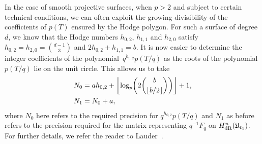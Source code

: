 \begin{rem} \label{rem:N0Surfaces}
In the case of smooth projective surfaces, when $p > 2$ and subject to 
certain technical conditions, we can often exploit the growing divisibility 
of the coefficients of $p(T)$ ensured by the Hodge polygon.  For such a surface 
of degree~$d$, we know that the Hodge numbers $h_{0,2}$, $h_{1,1}$ and $h_{2,0}$ 
satisfy $h_{0,2} = h_{2,0} = \binom{d-1}{3}$ and $2 h_{0,2} + h_{1,1} = b$. 
It is now easier to determine the integer coefficients of the 
polynomial~$q^{h_{0,2}} p(T/q)$ as the roots of the polynomial $p(T/q)$ lie 
on the unit circle.  This allows us to take 
\begin{align*}
N_0 & = a h_{0,2} + \left\lfloor\log_p \biggl( 2 \binom{b}{\left\lfloor b/2\right\rfloor}\biggr)\right\rfloor + 1,\\
N_1 & = N_0 + a,
\end{align*}
where $N_0$ here refers to the required precision for $q^{h_{0,2}} p(T/q)$ 
and $N_1$ as before refers to the precision required for the matrix 
representing $q^{-1} F_q$ on $H_{\text{dR}}^{n}(\mathfrak{U}_{t_1})$.
For further details, we refer the reader to 
Lauder~\citep[\S 9.3.2, Proposition~9.6]{Lauder2006}.
\end{rem}

